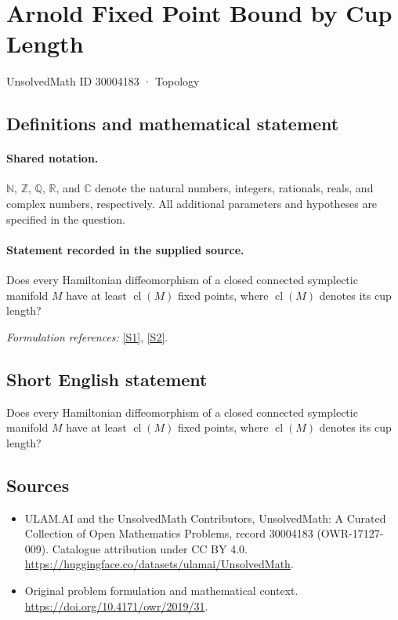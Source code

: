 \documentclass[11pt]{article}
\newcommand{\sref}[2]{\hyperlink{source:#1:#2}{[S#2]}}
\begin{document}
\setcounter{section}{30004182}
\section{Arnold Fixed Point Bound by Cup Length}\label{30004183}
{\small UnsolvedMath ID 30004183 · Topology}
\subsection{Definitions and mathematical statement}

\paragraph{Shared notation.}$\mathbb N$, $\mathbb Z$, $\mathbb Q$, $\mathbb R$, and $\mathbb C$ denote the natural numbers, integers, rationals, reals, and complex numbers, respectively. All additional parameters and hypotheses are specified in the question.


\paragraph{Statement recorded in the supplied source.}
Does every Hamiltonian diffeomorphism of a closed connected symplectic manifold $M$ have at least $\operatorname{cl}(M)$ fixed points, where $\operatorname{cl}(M)$ denotes its cup length?
\par\smallskip\textit{Formulation references:} \sref{30004183}{1}, \sref{30004183}{2}.
\subsection{Short English statement}
Does every Hamiltonian diffeomorphism of a closed connected symplectic manifold $M$ have at least $\operatorname{cl}(M)$ fixed points, where $\operatorname{cl}(M)$ denotes its cup length?
\subsection{Sources}
\begin{itemize}
\item[\hypertarget{source:30004183:1}{S1}] ULAM.AI and the UnsolvedMath Contributors, UnsolvedMath: A Curated Collection of Open Mathematics Problems, record 30004183 (OWR-17127-009). Catalogue attribution under CC BY 4.0.
\url{https://huggingface.co/datasets/ulamai/UnsolvedMath}.
\item[\hypertarget{source:30004183:2}{S2}] Original problem formulation and mathematical context.
\url{https://doi.org/10.4171/owr/2019/31}.
\end{itemize}
\label{end:30004183}
\end{document}
